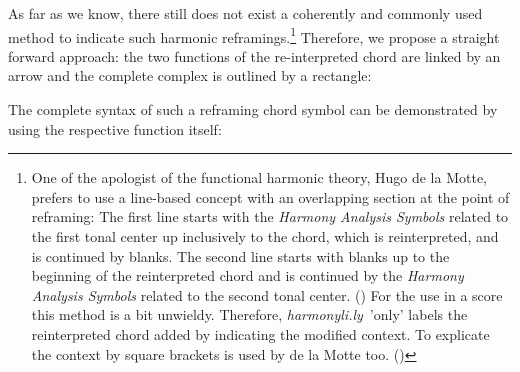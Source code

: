 \documentclass[
  DIV=calc,
  BCOR=5mm,
  12pt,
  headings=small,
  oneside,
  abstract=true,
  toc=bib,
  xcolor=dvipsnames,
  openany,
  english]{scrartcl}
\newcommand{\hlyn}[0]{\textit{harmonyli.ly}}
\newcommand{\has}[1]{\textit{Harmony Analysis Symbol#1}}
\begin{document}
As far as we know, there still does not exist a coherently and commonly used
method to indicate such harmonic reframings.\footnote{One of the apologist of the
functional harmonic theory, Hugo de la Motte, prefers to use a line-based
concept with an overlapping section at the point of reframing: The first line
starts with the \has{s} related to the first tonal center up inclusively to the
chord, which is reinterpreted, and is continued by blanks. The second line
starts with blanks up to the beginning of the reinterpreted chord and is
continued by the \has{s} related to the second tonal center. (\cite[cf.][144 et
passim]{Delamotte2011a}) For the use in a score this method is a bit unwieldy.
Therefore, \hlyn\ 'only' labels the reinterpreted chord added by indicating the
modified context. To explicate the context by square brackets is used by de la
Motte too. (\cite[cf.][226 et passim]{Delamotte2011a})} Therefore, we propose a
straight forward approach: the two functions of the re-interpreted chord are
linked by an arrow and the complete complex is outlined by a rectangle:

\begin{center}
\end{center}


The complete syntax of such a reframing chord symbol can be demonstrated by using
the respective function itself:
\end{document}
